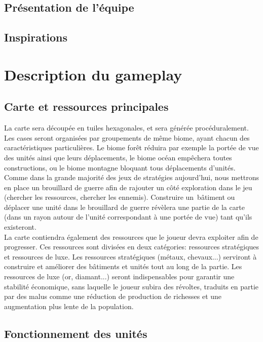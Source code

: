 \documentclass[12pt]{report}
\begin{document}
\section{Présentation de l'équipe}
\section{Inspirations}

\chapter{Description du gameplay}

\section{Carte et ressources principales}

La carte sera découpée en tuiles hexagonales, et sera générée procéduralement.  Les cases seront organisées par groupements de même biome, ayant chacun des caractéristiques particulières. Le biome forêt réduira par exemple la portée de vue des unités ainsi que leurs déplacements, le biome océan empêchera toutes constructions, ou le biome montagne bloquant tous déplacements d'unités.\\

Comme dans la grande majorité des jeux de stratégies aujourd'hui, nous mettrons en place un brouillard de guerre afin de rajouter un côté exploration dans le jeu (chercher les ressources, chercher les ennemis). Construire un  bâtiment ou déplacer une unité dans le brouillard de guerre révèlera une partie de la carte (dans un rayon autour de l'unité correspondant à une portée de vue) tant qu'ils existeront.\\

La carte contiendra également des ressources que le joueur devra exploiter afin de progresser. Ces ressources sont divisées en deux catégories: ressources stratégiques et ressources de luxe. Les ressources stratégiques (métaux, chevaux...) serviront à construire et améliorer des bâtiments et unités tout au long de la partie. Les ressources de luxe (or, diamant...) seront indispensables pour garantir une stabilité économique, sans laquelle le joueur subira des révoltes, traduits en partie par des malus comme une réduction de production de richesses et une augmentation plus lente de la population. 

\section{Fonctionnement des unités}
\end{document}
